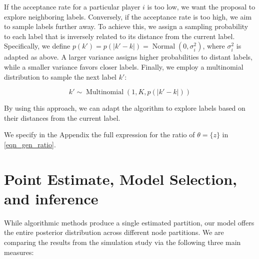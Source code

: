 \documentclass[11pt]{amsart}
\begin{document}
If the acceptance rate for a particular player $i$ is too low, we want the proposal to explore neighboring labels. Conversely, if the acceptance rate is too high, we aim to sample labels further away. To achieve this, we assign a sampling probability to each label that is inversely related to its distance from the current label. Specifically, we define $p(k') = p(|k' - k|) = \operatorname{Normal}(0, \sigma_i^2)$, where $\sigma_i^2$ is adapted as above. A larger variance assigns higher probabilities to distant labels, while a smaller variance favors closer labels. Finally, we employ a multinomial distribution to sample the next label $k'$:

\begin{equation}
k' \sim \operatorname{Multinomial}(1, K, p(|k' - k|))
\end{equation}

By using this approach, we can adapt the algorithm to explore labels based on their distances from the current label. 

We specify in the Appendix the full expression for the ratio of $\theta = \{z\}$ in \eqref{eqn_gen_ratio}.




\clearpage

\section{Point Estimate, Model Selection,  and inference}

While algorithmic methods produce a single estimated partition, our model offers the entire posterior distribution across different node partitions. We are comparing the results from the simulation study via the following three main measures:
\end{document}
